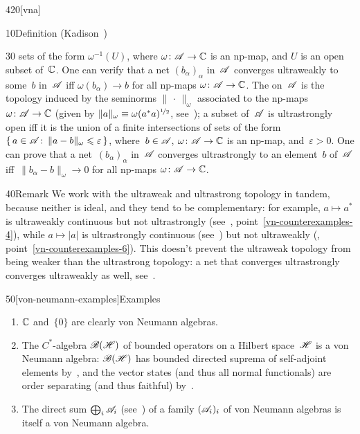 \begin{parsec}{420}[vna]
\begin{point}{10}{Definition (Kadison~\cite{kadison1956})}
\begin{point}{30}
sets of the form $\omega^{-1}(U)$, where
$\omega\colon \mathscr{A}\to\mathbb{C}$ is an np-map, 
and $U$ is an open subset of~$\mathbb{C}$.
One can verify that a net $(b_\alpha)_\alpha$
in~$\mathscr{A}$ converges ultraweakly to some~$b$ in~$\mathscr{A}$
    iff $\omega(b_\alpha)\to b$ for all
    np-maps $\omega\colon \mathscr{A}\to\mathbb{C}$.
The %
	on~$\mathscr{A}$
is the topology
induced by the seminorms
$\|\,\cdot\,\|_\omega$
associated to the np-maps $\omega\colon \mathscr{A}\to\mathbb{C}$
    (given by
$\|a\|_\omega \equiv \omega(a^*a)^{\nicefrac{1}{2}}$,
    see~);
a subset of~$\mathscr{A}$ is ultrastrongly open
iff it is the union of a finite intersections
of sets of the form
$\{\,a\in\mathscr{A}\colon\, \|a-b\|_\omega \leqslant \varepsilon\,\}$,
where~$b\in \mathscr{A}$, $\omega\colon \mathscr{A}\to\mathbb{C}$ is an np-map,
and~$\varepsilon>0$.
One can prove that a net~$(b_\alpha)_\alpha$
in~$\mathscr{A}$
converges ultrastrongly to an element~$b$ of~$\mathscr{A}$
    iff~$\|b_\alpha-b\|_\omega\to 0$ for all np-maps 
    $\omega\colon \mathscr{A}\to\mathbb{C}$.
\end{point}
\end{point}
\begin{point}{40}{Remark}%
We work with the ultraweak and ultrastrong topology in tandem,
because neither is ideal, and they tend to be complementary:
for example, $a\mapsto a^*$ is ultraweakly continuous
but not ultrastrongly (see~,
point~\ref{vn-counterexamples-4}), 
while $a\mapsto \left|a\right|$
is ultrastrongly continuous (see~)
but not ultraweakly (, 
point~\ref{vn-counterexamples-6}).
This doesn't prevent 
the ultraweak topology 
from being weaker than the ultrastrong topology:
a net that converges ultrastrongly converges ultraweakly as well,
see~.
\end{point}
\begin{point}{50}[von-neumann-examples]{Examples}%
\begin{enumerate}
\item
{}%
$\mathbb{C}$ and~$\{0\}$ are clearly von Neumann algebras.
\item
{}
The $C^*$-algebra $\mathscr{B}(\mathscr{H})$
of bounded operators on a Hilbert space~$\mathscr{H}$
is a von Neumann algebra:
$\mathscr{B}(\mathscr{H})$ has bounded directed suprema
of self-adjoint elements
by~,
and the vector states
(and thus all normal functionals)
are order separating
(and thus faithful)
by~.
\item%
%
The direct sum $\bigoplus_i \mathscr{A}_i$
(see~)
of a family $(\mathscr{A}_i)_i$
of von Neumann algebras
is itself a von Neumann algebra.


\end{enumerate}
\end{point}
\end{parsec}
